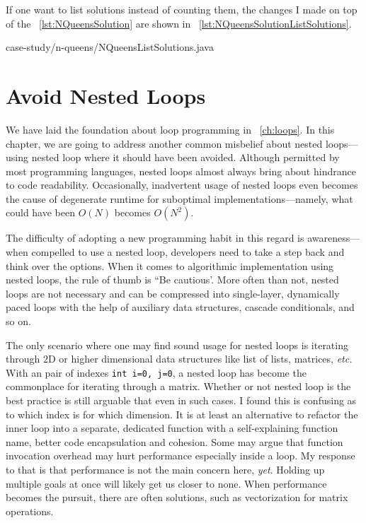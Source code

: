 \documentclass[oneside,11pt]{book}
\theoremstyle{definition}
\theoremstyle{remark}
\newcommand{\code}[1]{\mbox{\lstinline{#1}}}
\begin{document}
If one want to list solutions instead of counting them, the changes I made on top of the
~\autoref{lst:NQueensSolution} are shown in ~\autoref{lst:NQueensSolutionListSolutions}.


{case-study/n-queens/NQueensListSolutions.java}
\clearpage{}
    \clearpage{}

\chapter{Avoid Nested Loops} \label{ch:loop-thinning}

We have laid the foundation about loop programming in ~\autoref{ch:loops}.
In this chapter, we are going to address another common misbelief about nested loops---using
nested loop where it should have been avoided.
Although permitted by most programming languages, nested loops almost always bring about
hindrance to code readability.
Occasionally, inadvertent usage of nested loops even becomes the cause of degenerate runtime for
suboptimal implementations---namely, what could have been $O(N)$ becomes $O(N^2)$.


The difficulty of adopting a new programming habit in this regard is
awareness---when compelled to use a nested loop, developers need to take a step back
and think over the options.
When it comes to algorithmic implementation using nested loops, the rule of thumb is ``Be cautious'.
More often than not, nested loops are not necessary and can be compressed into single-layer,
dynamically paced loops with the help of auxiliary data structures, cascade conditionals, and so on.


The only scenario where one may find sound usage for nested loops is iterating through $2$D or
higher dimensional data structures like list of lists, matrices, \textit{etc.}
With an pair of indexes \code{int i=0, j=0}, a nested loop
has become the commonplace for iterating through a matrix.
Whether or not nested loop is the best practice is still arguable that even in such cases.
I found this is confusing as to which index is for which dimension.
It is at least an alternative to refactor the inner loop into a separate, dedicated
function with a self-explaining function name, better code encapsulation and cohesion.
Some may argue that function invocation overhead may hurt performance especially inside a loop.
My response to that is that performance is not the main concern here, \emph{yet}.
Holding up multiple goals at once will likely get us closer to none.
When performance becomes the pursuit, there are often solutions, such as vectorization for
matrix operations.
\end{document}
